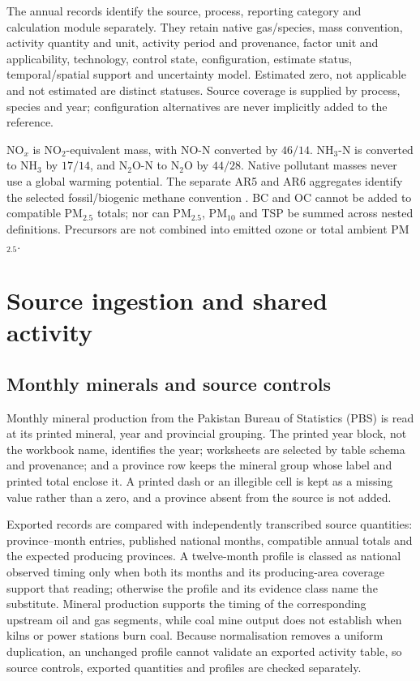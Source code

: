 \documentclass[essd]{copernicus}
\begin{document}
The annual records identify the source, process, reporting category and calculation module separately. They retain native gas/species, mass convention, activity quantity and unit, activity period and provenance, factor unit and applicability, technology, control state, configuration, estimate status, temporal/spatial support and uncertainty model. Estimated zero, not applicable and not estimated are distinct statuses. Source coverage is supplied by process, species and year; configuration alternatives are never implicitly added to the reference.

NO$_x$ is NO$_2$-equivalent mass, with NO-N converted by $46/14$. NH$_3$-N is converted to NH$_3$ by $17/14$, and N$_2$O-N to N$_2$O by $44/28$. Native pollutant masses never use a global warming potential. The separate AR5 and AR6 aggregates identify the selected fossil/biogenic methane convention \citep{IPCCAR5,IPCCAR6}. BC and OC cannot be added to compatible PM$_{2.5}$ totals; nor can PM$_{2.5}$, PM$_{10}$ and TSP be summed across nested definitions. Precursors are not combined into emitted ozone or total ambient PM$_{2.5}$.

\section{Source ingestion and shared activity}
\subsection{Monthly minerals and source controls}
Monthly mineral production from the Pakistan Bureau of Statistics (PBS) is read at its printed mineral, year and provincial grouping. The printed year block, not the workbook name, identifies the year; worksheets are selected by table schema and provenance; and a province row keeps the mineral group whose label and printed total enclose it. A printed dash or an illegible cell is kept as a missing value rather than a zero, and a province absent from the source is not added.

Exported records are compared with independently transcribed source quantities: province--month entries, published national months, compatible annual totals and the expected producing provinces. A twelve-month profile is classed as national observed timing only when both its months and its producing-area coverage support that reading; otherwise the profile and its evidence class name the substitute. Mineral production supports the timing of the corresponding upstream oil and gas segments, while coal mine output does not establish when kilns or power stations burn coal. Because normalisation removes a uniform duplication, an unchanged profile cannot validate an exported activity table, so source controls, exported quantities and profiles are checked separately.
\end{document}
